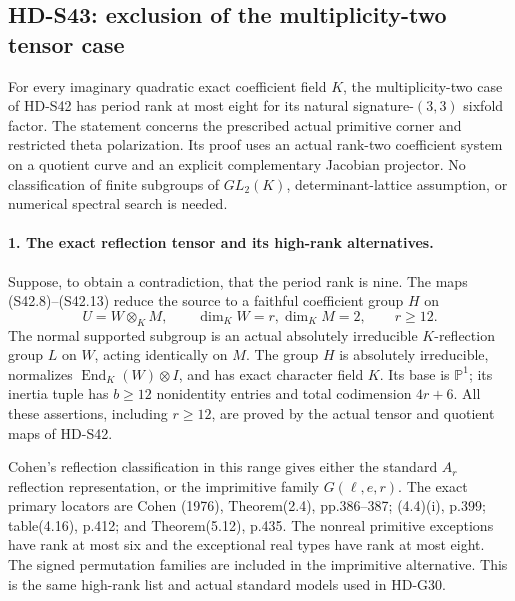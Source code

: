 \subsection{HD-S43: exclusion of the multiplicity-two tensor case}
\label{sec:two-multiplicity-tensor-exclusion}

For every imaginary quadratic exact coefficient field \(K\),
the multiplicity-two case of HD-S42 has period rank at most
eight for its natural signature-\((3,3)\) sixfold factor.
The statement concerns the prescribed actual primitive corner
and restricted theta polarization. Its proof uses an actual
rank-two coefficient system on a quotient curve and an
explicit complementary Jacobian projector. No classification
of finite subgroups of \(GL_2(K)\), determinant-lattice
assumption, or numerical spectral search is needed.

\paragraph{1. The exact reflection tensor and its high-rank alternatives.}
Suppose, to obtain a contradiction, that the period rank is
nine. The maps (S42.8)--(S42.13) reduce the source to a
faithful coefficient group \(H\) on
\[
             U=W\otimes_K M,\qquad \dim_KW=r,
                   \dim_K M=2,\qquad r\ge12.              \tag{S43.1}
\]
The normal supported subgroup is an actual absolutely
irreducible \(K\)-reflection group \(L\) on \(W\),
acting identically on \(M\). The group \(H\) is absolutely
irreducible, normalizes \(\operatorname{End}_K(W)\otimes I\),
and has exact character field \(K\). Its base is
\(\mathbb P^1\); its inertia tuple has \(b\ge12\)
nonidentity entries and total codimension \(4r+6\).
All these assertions, including \(r\ge12\), are proved
by the actual tensor and quotient maps of HD-S42.

Cohen's reflection classification in this range gives either
the standard \(A_r\) reflection representation, or the
imprimitive family \(G(\ell,e,r)\). The exact primary
locators are Cohen (1976), Theorem(2.4), pp.386--387;
(4.4)(i), p.399; table(4.16), p.412; and Theorem(5.12),
p.435. The nonreal primitive exceptions have rank at most
six and the exceptional real types have rank at most eight.
The signed permutation families are included in the
imprimitive alternative. This is the same high-rank list
and actual standard models used in HD-G30.

